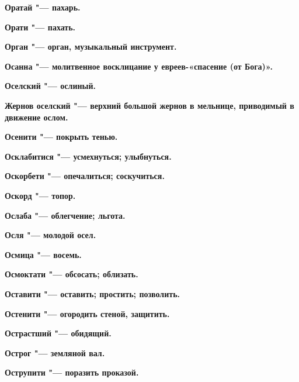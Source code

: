 \begin{multicols}{2}
\bfseries Оратай\normalfont{} "--- пахарь. 




\bfseries Орати\normalfont{} "--- пахать. 




\bfseries Орган\normalfont{} "--- орган, музыкальный инструмент. 




\bfseries Осанна\normalfont{} "--- молитвенное восклицание у евреев-«спасение (от Бога)». 




\bfseries Оселский\normalfont{} "--- ослиный. 




\bfseries Жернов оселский\normalfont{} "--- верхний большой жернов в мельнице, приводимый в движение ослом. 




\bfseries Осенити\normalfont{} "--- покрыть тенью. 




\bfseries Осклабитися\normalfont{} "--- усмехнуться; улыбнуться. 




\bfseries Оскорбети\normalfont{} "--- опечалиться; соскучиться. 




\bfseries Оскорд\normalfont{} "--- топор. 




\bfseries Ослаба\normalfont{} "--- облегчение; льгота. 




\bfseries Осля\normalfont{} "--- молодой осел. 




\bfseries Осмица\normalfont{} "--- восемь. 




\bfseries Осмоктати\normalfont{} "--- обсосать; облизать. 




\bfseries Оставити\normalfont{} "--- оставить; простить; позволить. 




\bfseries Остенити\normalfont{} "--- огородить стеной, защитить. 




\bfseries Острастший\normalfont{} "--- обидящий. 




\bfseries Острог\normalfont{} "--- земляной вал. 




\bfseries Острупити\normalfont{} "--- поразить проказой. 





\end{multicols}

